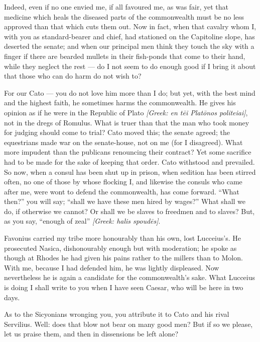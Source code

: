  Indeed, even if no one envied me, if all favoured me, as was fair, yet that medicine which heals the diseased parts of the commonwealth must be no less approved than that which cuts them out. Now in fact, when that cavalry whom I, with you as standard-bearer and chief, had stationed on the Capitoline slope, has deserted the senate; and when our principal men think they touch the sky with a finger if there are bearded mullets in their fish-ponds that come to their hand, while they neglect the rest --- do I not seem to do enough good if I bring it about that those who can do harm do not wish to?

 For our Cato --- you do not love him more than I do; but yet, with the best mind and the highest faith, he sometimes harms the commonwealth. He gives his opinion as if he were in the Republic of Plato \textit{[Greek: en t\=ei Plat\=onos politeiai]}, not in the dregs of Romulus. What is truer than that the man who took money for judging should come to trial? Cato moved this; the senate agreed; the equestrians made war on the senate-house, not on me (for I disagreed). What more impudent than the publicans renouncing their contract? Yet some sacrifice had to be made for the sake of keeping that order. Cato withstood and prevailed. So now, when a consul has been shut up in prison, when sedition has been stirred often, no one of those by whose flocking I, and likewise the consuls who came after me, were wont to defend the commonwealth, has come forward. ``What then?'' you will say; ``shall we have these men hired by wages?'' What shall we do, if otherwise we cannot? Or shall we be slaves to freedmen and to slaves? But, as you say, ``enough of zeal'' \textit{[Greek: halis spoud\=es]}.

 Favonius carried my tribe more honourably than his own, lost Lucceius's. He prosecuted Nasica, dishonourably enough but with moderation; he spoke as though at Rhodes he had given his pains rather to the millers than to Molon. With me, because I had defended him, he was lightly displeased. Now nevertheless he is again a candidate for the commonwealth's sake. What Lucceius is doing I shall write to you when I have seen Caesar, who will be here in two days.

 As to the Sicyonians wronging you, you attribute it to Cato and his rival Servilius. Well: does that blow not bear on many good men? But if so we please, let us praise them, and then in dissensions be left alone?

